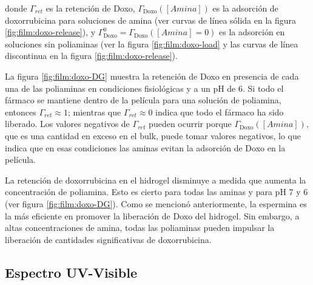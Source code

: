 \noindent donde $\Gamma_{ret}$ es la retenci\'on de Doxo, $\Gamma_\text{Doxo}([Amina])$ es la adsorci\'on de doxorrubicina para soluciones de amina (ver curvas de l\'inea s\'olida en la figura \ref{fig:film:doxo-release}), y $\Gamma_\text{Doxo}^0=\Gamma_\text{Doxo}([Amina]=0)$ es la adsorci\'on en soluciones sin poliaminas (ver la figura \ref{fig:film:doxo-load} y las curvas de l\'inea discontinua en la figura \ref{fig:film:doxo-release}).

La figura \ref{fig:film:doxo-DG} muestra la retenci\'on de Doxo en presencia de cada una de las poliaminas en condiciones fisiol\'ogicas y a un pH de 6. Si todo el f\'armaco se mantiene dentro de la pel\'icula para una soluci\'on de poliamina, entonces $\Gamma_{ret}\approx 1$; mientras que $\Gamma_{ret}\approx 0$ indica que todo el f\'armaco ha sido liberado. Los valores negativos de $\Gamma_{ret}$ pueden ocurrir porque $\Gamma_\text{Doxo}([Amina])$, que es una cantidad en exceso en el bulk, puede tomar valores negativos, lo que indica que en esas condiciones las aminas evitan la adsorci\'on de Doxo en la pel\'icula.

La retenci\'on de doxorrubicina en el hidrogel disminuye a medida que aumenta la concentraci\'on de poliamina. Esto es cierto para todas las aminas y para pH 7 y 6 (ver figura \ref{fig:film:doxo-DG}). Como se mencion\'o anteriormente, la espermina es la m\'as eficiente en promover la liberaci\'on de Doxo del hidrogel. Sin embargo, a altas concentraciones de amina, todas las poliaminas pueden impulsar la liberaci\'on de cantidades significativas de doxorrubicina.


\subsection{Espectro UV-Visible}

